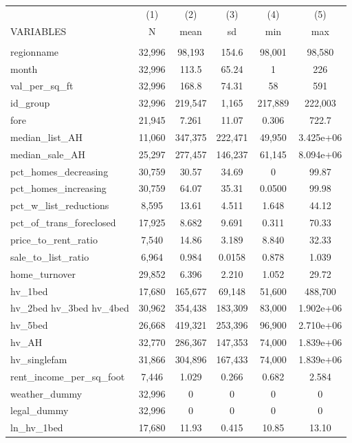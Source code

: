\begin{tabular}{lccccc} \hline
 & (1) & (2) & (3) & (4) & (5) \\
VARIABLES & N & mean & sd & min & max \\ \hline
 &  &  &  &  &  \\
regionname & 32,996 & 98,193 & 154.6 & 98,001 & 98,580 \\
month & 32,996 & 113.5 & 65.24 & 1 & 226 \\
val\_per\_sq\_ft & 32,996 & 168.8 & 74.31 & 58 & 591 \\
id\_group & 32,996 & 219,547 & 1,165 & 217,889 & 222,003 \\
fore & 21,945 & 7.261 & 11.07 & 0.306 & 722.7 \\
median\_list\_AH & 11,060 & 347,375 & 222,471 & 49,950 & 3.425e+06 \\
median\_sale\_AH & 25,297 & 277,457 & 146,237 & 61,145 & 8.094e+06 \\
pct\_homes\_decreasing & 30,759 & 30.57 & 34.69 & 0 & 99.87 \\
pct\_homes\_increasing & 30,759 & 64.07 & 35.31 & 0.0500 & 99.98 \\
pct\_w\_list\_reductions & 8,595 & 13.61 & 4.511 & 1.648 & 44.12 \\
pct\_of\_trans\_foreclosed & 17,925 & 8.682 & 9.691 & 0.311 & 70.33 \\
price\_to\_rent\_ratio & 7,540 & 14.86 & 3.189 & 8.840 & 32.33 \\
sale\_to\_list\_ratio & 6,964 & 0.984 & 0.0158 & 0.878 & 1.039 \\
home\_turnover & 29,852 & 6.396 & 2.210 & 1.052 & 29.72 \\
hv\_1bed & 17,680 & 165,677 & 69,148 & 51,600 & 488,700 \\
hv\_2bed 
hv\_3bed 
hv\_4bed & 30,962 & 354,438 & 183,309 & 83,000 & 1.902e+06 \\
hv\_5bed & 26,668 & 419,321 & 253,396 & 96,900 & 2.710e+06 \\
hv\_AH & 32,770 & 286,367 & 147,353 & 74,000 & 1.839e+06 \\
hv\_singlefam & 31,866 & 304,896 & 167,433 & 74,000 & 1.839e+06 \\
rent\_income\_per\_sq\_foot & 7,446 & 1.029 & 0.266 & 0.682 & 2.584 \\
weather\_dummy & 32,996 & 0 & 0 & 0 & 0 \\
legal\_dummy & 32,996 & 0 & 0 & 0 & 0 \\
ln\_hv\_1bed & 17,680 & 11.93 & 0.415 & 10.85 & 13.10 \\

\end{tabular}
